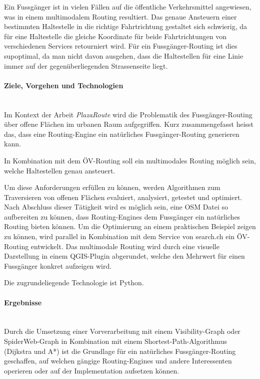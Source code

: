 Ein Fussgänger ist in vielen Fällen auf die öffentliche Verkehrsmittel angewiesen, was in einem multimodalem Routing resultiert. Das genaue Ansteuern einer bestimmten Haltestelle in die richtige Fahrtrichtung gestaltet sich schwierig, da für eine Haltestelle die gleiche Koordinate für beide Fahrtrichtungen von verschiedenen Services retourniert wird. Für ein Fussgänger-Routing ist dies supoptimal, da man nicht davon ausgehen, dass die Haltestellen für eine Linie immer auf der gegenüberliegenden Strassenseite liegt.


\paragraph{Ziele, Vorgehen und Technologien}~\\
Im Kontext der Arbeit \emph{PlazaRoute} wird die Problematik des Fussgänger-Routing über offene Flächen im urbanen Raum aufgegriffen. Kurz zusammengefasst heisst das, dass eine Routing-Engine ein natürliches Fussgänger-Routing generieren kann.

In Kombination mit dem ÖV-Routing soll ein multimodales Routing möglich sein, welche Haltestellen genau ansteuert.

Um diese Anforderungen erfüllen zu können, werden Algorithmen zum Traversieren von offenen Flächen evaluiert, analysiert, getestet und optimiert. Nach Abschluss dieser Tätigkeit wird es möglich sein, eine \ac{OSM} Datei so aufbereiten zu können, dass Routing-Engines dem Fussgänger ein natürliches Routing bieten können. Um die Optimierung an einem praktischen Beispiel zeigen zu können, wird parallel in Kombination mit dem Service von search.ch ein ÖV-Routing entwickelt. Das multimodale Routing wird durch eine visuelle Darstellung in einem QGIS-Plugin abgerundet, welche den Mehrwert für einen Fussgänger konkret aufzeigen wird.

Die zugrundeliegende Technologie ist Python.

\paragraph{Ergebnisse}~\\
Durch die Umsetzung einer Vorverarbeitung mit einem Visibility-Graph oder SpiderWeb-Graph in Kombination mit einem Shortest-Path-Algorithmus (Dijkstra und A*) ist die Grundlage für ein natürliches Fussgänger-Routing geschaffen, auf welchen gängige Routing-Engines und andere Interessenten operieren oder auf der Implementation aufsetzen können.


